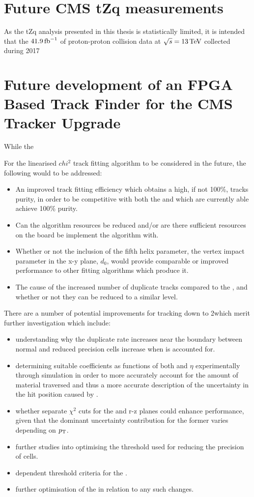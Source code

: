 \section{Future CMS tZq measurements}
As the tZq analysis presented in this thesis is statistically limited, it is intended that the $41.9\mbox{\ensuremath{\,\text{fb}^\text{$-$1}}}$ of proton-proton collision data at $\sqrt{s} = 13\,\text{Te\hspace{-.08em}V}$ collected during 2017 

\section{Future development of an FPGA Based Track Finder for the CMS Tracker Upgrade}
While the 

For the linearised $chi^{2}$ track fitting algorithm to be considered in the future, the following would to be addressed:
\begin{itemize}
\item An improved track fitting efficiency which obtains a high, if not 100\%, tracks purity, in order to be competitive with both the \KF and \LR which are currently able achieve 100\% purity.
\item Can the algorithm resources be reduced and/or are there sufficient resources on the board be implement the algorithm with.
\item Whether or not the inclusion of the fifth helix parameter, the vertex impact parameter in the x-y plane, $d_{0}$, would provide comparable or improved performance to other fitting algorithms which produce it.
\item The cause of the increased number of duplicate tracks compared to the \KF, and whether or not they can be reduced to a similar level.
\end{itemize}

There are a number of potential improvements for tracking down to 2\GeV which merit further investigation which include:
\begin{itemize}
\item understanding why the duplicate rate increases near the boundary between normal and reduced precision \HT cells increase when \MS is accounted for.
\item determining suitable coefficients as functions of both \pT and $\eta$ experimentally through simulation in order to more accurately account for the amount of material traversed and thus a more accurate description of the uncertainty in the hit position caused by \MS.
\item whether separate \KF $\chi^{2}$ cuts for the \rphi and r-z planes could enhance performance, given that the dominant uncertainty contribution for the former varies depending on $p_{\mathrm{T}}$.
\item further studies into optimising the \pT threshold used for reducing the precision of \HT cells.
\item \pt dependent threshold criteria for the \HT.
\item further optimisation of the \KF in relation to any such changes.
\end{itemize}

